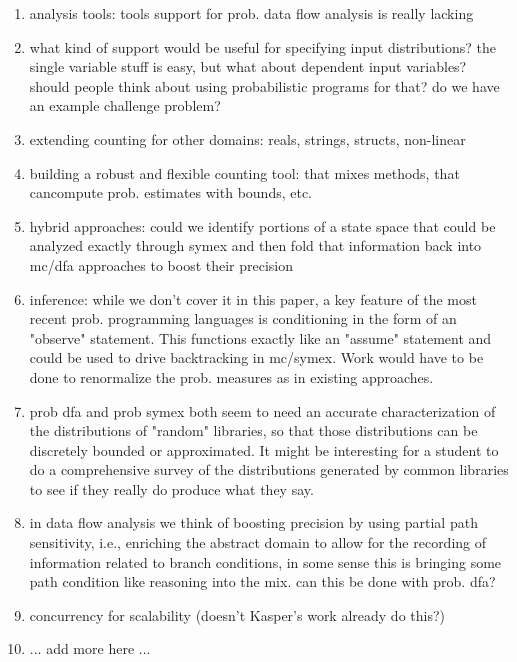 \begin{enumerate}
\item analysis tools: tools support for prob. data flow analysis is really lacking
\item what kind of support would be useful for specifying input distributions?
the single variable stuff is easy, but what about dependent input variables?
should people think about using probabilistic programs for that?  do we have an example challenge problem?
\item extending counting for other domains: reals, strings, structs, non-linear
\item building a robust and flexible counting tool: that mixes methods, that cancompute prob. estimates with bounds, etc.
\item hybrid approaches: could we identify portions of a state
space that could be analyzed exactly through symex and then fold
that information back into mc/dfa approaches to boost their precision
\item inference: while we don't cover it in this paper, a key feature of
the most recent prob. programming languages is conditioning in the form
of an "observe" statement.  This functions exactly like an "assume" 
statement and could be used to drive backtracking in mc/symex.  Work
would have to be done to renormalize the prob. measures as in existing
approaches.
\item prob dfa and prob symex both seem to need an accurate characterization
of the distributions of "random" libraries, so that those distributions can be 
discretely bounded or approximated.  It might be interesting for a student
to do a comprehensive survey of the distributions generated by common
libraries to see if they really do produce what they say.
\item in data flow analysis we think of boosting precision by using partial
path sensitivity, i.e., enriching the abstract domain to allow for the recording of information related to branch conditions, in some sense this is bringing some path condition like reasoning into the mix.  can this be done with prob. dfa?
\item concurrency for scalability (doesn't Kasper's work already do this?)
\item ... add more here ...
\end{enumerate}
